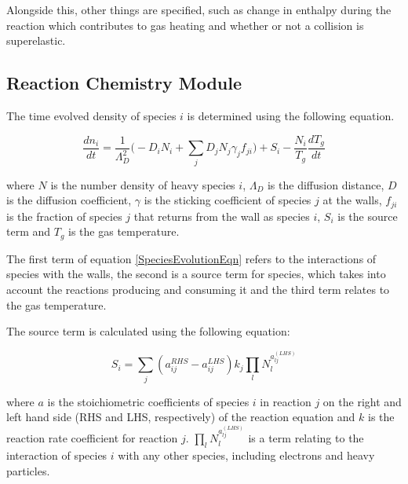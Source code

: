 \documentclass[11pt, oneside]{article}   	%
\begin{document}
Alongside this, other things are specified, such as change in enthalpy during the reaction which contributes to gas heating and whether or not a collision is superelastic.

\subsection{Reaction Chemistry Module}

The time evolved density of species $i$ is determined using the following equation.

\begin{equation}
\frac{dn_i}{dt} = \frac{1}{\Lambda_D^2}\bigg(-D_iN_i + \sum_jD_jN_j\gamma_jf_{ji}\bigg) + S_i - \frac{N_i}{T_g}\frac{dT_g}{dt}
\label{SpeciesEvolutionEqn}
\end{equation}

where $N$ is the number density of heavy species $i$, $\Lambda_D$ is the diffusion distance, $D$ is the diffusion coefficient, $\gamma$ is the sticking coefficient of species $j$ at the walls, $f_{ji}$ is the fraction of species $j$ that returns from the wall as species $i$, $S_i$ is the source term and $T_g$ is the gas temperature.

The first term of equation \ref{SpeciesEvolutionEqn} refers to the interactions of species with the walls, the second is a source term for species, which takes into account the reactions producing and consuming it and the third term relates to the gas temperature.

The source term is calculated using the following equation:

\begin{equation}
S_i = \sum_j(a_{ij}^{RHS}-a_{ij}^{LHS})k_j\prod_lN_l^{a_{lj}^{(LHS)}}
\label{SourceTermEqn}
\end{equation}

where $a$ is the stoichiometric coefficients of species $i$ in reaction $j$ on the right and left hand side (RHS and LHS, respectively) of the reaction equation and $k$ is the reaction rate coefficient for reaction $j$.
$\prod_lN_l^{a_{lj}^{(LHS)}}$ is a term relating to the interaction of species $i$ with any other species, including electrons and heavy particles.
\end{document}
